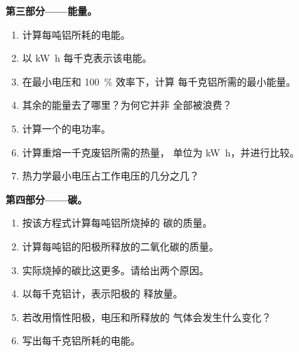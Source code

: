 \begin{problem}
\medskip
\noindent\textbf{第三部分——能量。}
\begin{enumerate}[resume]
  \item 计算每吨铝所耗的电能。
  \item 以 \unit{kW.h} 每千克表示该电能。
  \item 在最小电压和 100~\% 效率下，计算
        每千克铝所需的最小能量。
  \item 其余的能量去了哪里？为何它并非
        全部被浪费？
  \item 计算一个的电功率。
  \item 计算重熔一千克废铝所需的热量，
        单位为 \unit{kW.h}，并进行比较。
  \item 热力学最小电压占工作电压的几分之几？
\end{enumerate}

\medskip
\noindent\textbf{第四部分——碳。}
\begin{enumerate}[resume]
  \item 按该方程式计算每吨铝所烧掉的
        碳的质量。
  \item 计算每吨铝的阳极所释放的二氧化碳的质量。
  \item 实际烧掉的碳比这更多。请给出两个原因。
  \item 以每千克铝计，表示阳极的  释放量。
  \item 若改用惰性阳极，电压和所释放的
        气体会发生什么变化？
  \item 写出每千克铝所耗的电能。
\end{enumerate}
\end{problem}
